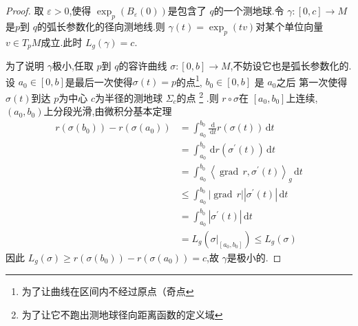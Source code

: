 \documentclass[../../几何与拓扑.tex]{subfiles}
\begin{document}
\begin{proof}
    取 \(   \varepsilon >0  \),使得 \(  \exp _{p}\left( B_{ \varepsilon }\left( 0 \right)  \right)   \)是包含了 \(  q  \)的一个测地球.令 \(   \gamma :\left[ 0,c \right]\to M   \)是\(  p  \)到 \(  q  \)的弧长参数化的径向测地线.则 \(   \gamma \left( t \right)= \exp _{p}\left( tv \right)    \)对某个单位向量\(  v \in T_{p}M  \)成立.此时 \(  L_{g}\left(  \gamma  \right)=    c\).
    
    为了说明 \(   \gamma   \)极小,任取 \(  p  \)到 \(  q  \)的容许曲线 \(   \sigma :\left[ 0,b \right]\to M   \),不妨设它也是弧长参数化的.设 \(  a_0\in \left[ 0,b \right]   \)是最后一次使得\(   \sigma \left( t \right)= p   \)的点\footnote{为了让曲线在区间内不经过原点（奇点}, \(  b_0 \in \left[ 0,b \right]   \)  是 \(  a_0  \)之后 第一次使得 \(   \sigma \left( t \right)   \)到达 \(  p  \)为中心 \(  c  \)为半径的测地球 \(   \Sigma _{c}  \)的点 \footnote{为了让它不跑出测地球径向距离函数的定义域}    .则 \(  r\circ  \sigma   \)在 \(  \left[ a_0,b_0 \right]   \)上连续, \(  \left( a_0,b_0 \right)   \)上分段光滑,由微积分基本定理 \begin{equation}\label{eq-2}
        \begin{aligned}
            r\left(  \sigma \left( b_0 \right)  \right)-r\left(  \sigma \left( a_0 \right)  \right)& =  \int_{a_0}^{b_0}\frac{\,\mathrm{d}  }{\,\mathrm{d} t }r\left(  \sigma \left( t \right)  \right)\,\mathrm{d} t\\ 
             & = \int_{a_0}^{b_0}\,\mathrm{d} r\left(  \sigma ^{\prime} \left( t \right)  \right) \,\mathrm{d} t\\ 
              & = \int_{a_0}^{b_0} \left<\operatorname{grad}\,r, \sigma ^{\prime} \left( t \right)  \right>_{g}\,\mathrm{d} t\\ 
               & \le \int_{a_0}^{b_0}\left| \operatorname{grad}\,r \right|\left|  \sigma ^{\prime} \left( t \right)  \right|\,\mathrm{d} t\\ 
                & =   \int_{a_0}^{b_0}\left|  \sigma ^{\prime} \left( t \right)  \right|\,\mathrm{d} t\\ 
                 & =  L_{g}\left(  \sigma |_{\left[ a_0,b_0 \right] } \right)\le L_{g}\left(  \sigma  \right) 
            \end{aligned}
    \end{equation}因此 \(  L_{g}\left(  \sigma  \right)\ge r\left(  \sigma \left( b_0 \right)  \right)-r\left(  \sigma \left( a_0 \right)  \right)= c     \),故 \(   \gamma   \)是极小的.  


\end{proof}
\end{document}
